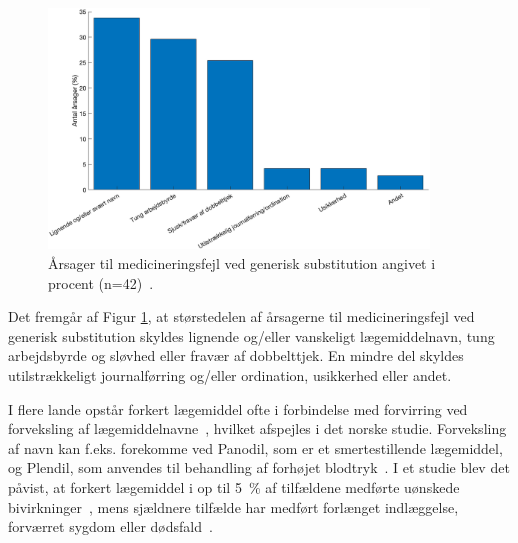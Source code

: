 \vspace{-0.2cm}
\begin{figure}[H]\centering	\includegraphics[width=0.9\textwidth]{billeder/GenSubbb.png} 
	\caption{Årsager til medicineringsfejl ved generisk substitution angivet i procent (n=42)~\citep{Hakonsen2010}.}	\label{fig:GeneriskSubstitution1}  
\end{figure}
\vspace{-1cm}

Det fremgår af Figur \ref{fig:GeneriskSubstitution1}, at størstedelen af årsagerne til medicineringsfejl ved generisk substitution skyldes lignende og/eller vanskeligt lægemiddelnavn, tung arbejdsbyrde og sløvhed eller fravær af dobbelttjek. En mindre del skyldes utilstrækkeligt journalførring og/eller ordination, usikkerhed eller andet. 

%

I flere lande opstår forkert lægemiddel ofte i forbindelse med forvirring ved forveksling af lægemiddelnavne~\citep{DanskSelskabforPatientsikkerhed2009}, hvilket afspejles i det norske studie. Forveksling af navn kan f.eks. forekomme ved Panodil, som er et smertestillende lægemiddel, og Plendil, som anvendes til behandling af forhøjet blodtryk~\citep{DanskSelskabforPatientsikkerhed2009}. 
I et studie blev det påvist, at forkert lægemiddel i op til 5~\% af tilfældene medførte uønskede bivirkninger~\citep{Basco2010}, mens sjældnere tilfælde har medført forlænget indlæggelse, forværret sygdom eller dødsfald~\citep{DanskSelskabforPatientsikkerhed2009}.

